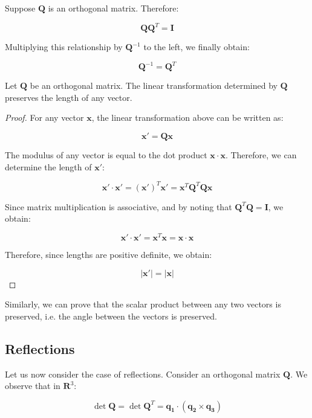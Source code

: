 \documentclass[12pt]{article}
\begin{document}
\begin{proposition}[Inverse]
    Suppose $\mathbf{Q}$ is an orthogonal matrix. Therefore:

    \[ \mathbf{Q}\mathbf{Q}^T = \mathbf{I} \]

    Multiplying this relationship by $\mathbf{Q}^{-1}$ to the left, we finally obtain:

    \[ \mathbf{Q}^{-1} = \mathbf{Q}^T \]
\end{proposition}

\begin{proposition}
    Let $\mathbf{Q}$ be an orthogonal matrix. The linear transformation determined by $\mathbf{Q}$ preserves the length of any vector.
\end{proposition}

\begin{proof}
    For any vector $\mathbf{x}$, the linear transformation above can be written as:

    \[ \mathbf{x}' = \mathbf{Qx} \]

    The modulus of any vector is equal to the dot product $\mathbf{x} \cdot \mathbf{x}$. Therefore, we can determine the length of $\mathbf{x}'$:

    \[ \mathbf{x}' \cdot \mathbf{x}' = (\mathbf{x'})^T\mathbf{x'} = \mathbf{x}^T\mathbf{Q}^T\mathbf{Qx} \]

    Since matrix multiplication is associative, and by noting that $\mathbf{Q}^T\mathbf{Q} = \mathbf{I}$, we obtain:

    \[ \mathbf{x}' \cdot \mathbf{x}' = \mathbf{x}^T\mathbf{x} = \mathbf{x \cdot x} \]

    Therefore, since lengths are positive definite, we obtain:

    \[ |\mathbf{x'}| = |\mathbf{x}| \]
\end{proof}

Similarly, we can prove that the scalar product between any two vectors is preserved, i.e. the angle between the vectors is preserved.

\newpage

\subsection{Reflections}

Let us now consider the case of reflections. Consider an orthogonal matrix $\mathbf{Q}$. We observe that in $\mathbf{R}^3$:

\[ \det{\mathbf{Q}} = \det{\mathbf{Q}^T} = \mathbf{q_1 \cdot (q_2 \times q_3)} \]
\end{document}
